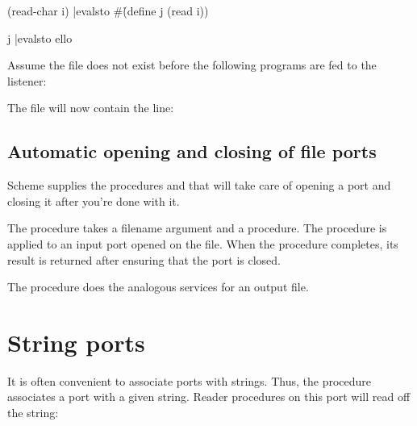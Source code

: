 {{{(read-char i)
|evalsto #\h

(define j (read i))

j
|evalsto ello
}

Assume the file  does not exist before the
following programs are fed to the listener:


\n The file  will now contain the
line:


\subsection{Automatic opening and closing of file ports}

Scheme supplies the procedures  and
 that will take care of opening a
port and closing it after you’re done with it.

The procedure  takes a filename
argument and a procedure.  The procedure is applied to an
input port opened on the file.  When the procedure
completes, its result is returned after ensuring that the
port is closed.


The procedure  does the analogous
services for an output file.



\section{String ports}

It is often convenient to associate ports with strings.
Thus, the procedure  associates a port
with a given string.  Reader procedures on this port will
read off the string:

}}
